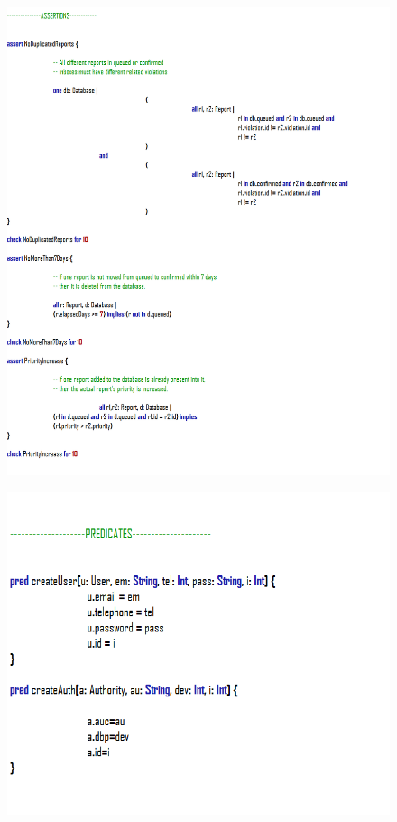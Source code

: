 \documentclass[12pt,a4paper]{article}
\begin{document}
			\begin{figure}[H]
				\centering
				\includegraphics[width=1\linewidth]{../assets/images/exports/user/Assertions.png}
				\label{fig:assertions}
			\end{figure}
			\begin{figure}[H]
				\centering
				\includegraphics[width=1.2\linewidth]{../assets/images/exports/user/Predicates.png}
				\label{fig:predicates}
			\end{figure}
\end{document}
